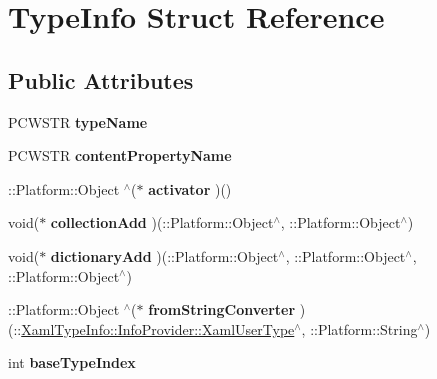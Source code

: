 \hypertarget{struct_type_info}{}\section{Type\+Info Struct Reference}
\label{struct_type_info}
\subsection*{Public Attributes}
\begin{DoxyCompactItemize}
\item 
\mbox{\label{struct_type_info_ac96e0ac3a90519fe82d52dcb1d437b69}} 
P\+C\+W\+S\+TR {\bfseries type\+Name}
\item 
\mbox{\label{struct_type_info_a7b879dc1c4f39f9dea21325fac36a490}} 
P\+C\+W\+S\+TR {\bfseries content\+Property\+Name}
\item 
\mbox{\label{struct_type_info_ac4c8d6c095cd9a703cbbd5b129f83fc3}} 
\+::Platform\+::\+Object $^\wedge$($\ast$ {\bfseries activator} )()
\item 
\mbox{\label{struct_type_info_a8b3397574a15cdf11f51fe273d88666e}} 
void($\ast$ {\bfseries collection\+Add} )(\+::Platform\+::\+Object$^\wedge$, \+::Platform\+::\+Object$^\wedge$)
\item 
\mbox{\label{struct_type_info_a5ad8d3830f375c9fa644207e251b33ff}} 
void($\ast$ {\bfseries dictionary\+Add} )(\+::Platform\+::\+Object$^\wedge$, \+::Platform\+::\+Object$^\wedge$, \+::Platform\+::\+Object$^\wedge$)
\item 
\mbox{\label{struct_type_info_a37bb5833bafdb1cb3dd230b2cb760178}} 
\+::Platform\+::\+Object $^\wedge$($\ast$ {\bfseries from\+String\+Converter} )(\+::\mbox{\hyperlink{class_xaml_type_info_1_1_info_provider_1_1_xaml_user_type}{Xaml\+Type\+Info\+::\+Info\+Provider\+::\+Xaml\+User\+Type}}$^\wedge$, \+::Platform\+::\+String$^\wedge$)
\item 
\mbox{\label{struct_type_info_aff93d3f95b4616d747537c0685309690}} 
int {\bfseries base\+Type\+Index}
\item 
\mbox{\label{struct_type_info_a2817c0975e3c8779d48abccb85005e4e}} 

\end{DoxyCompactItemize}
